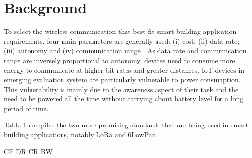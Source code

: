 \section{Background} \label{sec:Background}

To select the wireless communication that best fit smart building application requirements,
	four main parameters are generally used:
	(i) cost;
	(ii) data rate;
	(iii) autonomy and (iv) communication range \cite{lopes_design_2019}.
As data rate and communication range are inversely proportional to autonomy,
	devices need to consume more energy to communicate at higher bit rates and greater distances.
\ac{IoT} devices in emerging evaluation system are particularly vulnerable to power consumption.
This vulnerability is mainly due to the awareness aspect of their task and the need to be powered all the time without carrying about battery level for a long period of time.

Table 1 compiles the two more promising standards that are being used in smart building applications,
	notably LoRa and 6LowPan.

\ac{CF} \ac{DR} \ac{CR} \ac{BW}

